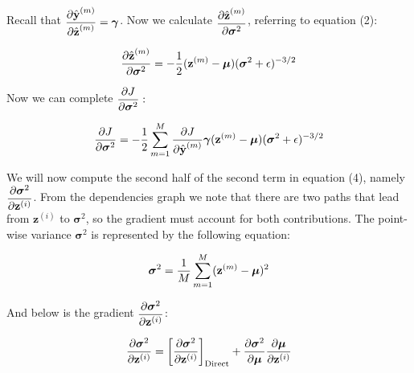 \documentclass{article}
\begin{document}
\begin{multicols}{2}
Recall that $\begin{aligned}
    {\partial \hat{\textbf{y}}^{(m)} \over \partial \hat{\textbf{z}}^{(m)}} = \boldsymbol{\gamma}
\end{aligned}$. Now we calculate $\begin{aligned}
    {\partial \hat{\textbf{z}}^{(m)} \over \partial \boldsymbol{\sigma}^2} 
\end{aligned}$, referring to equation (2):

\begin{equation}
    {\partial \hat{\textbf{z}}^{(m)} \over \partial \boldsymbol{\sigma}^2} =
    -{1\over 2} (\textbf{z}^{(m)} - \boldsymbol{\mu}) (\boldsymbol{\sigma}^2 + \epsilon)^{-3/2} \notag
\end{equation}

Now we can complete $\begin{aligned}
    {\partial J \over \partial \boldsymbol{\sigma}^2}:
\end{aligned}$

\begin{equation}
    {\partial J \over \partial \boldsymbol{\sigma}^2} = -{1\over 2}
    \sum_{m = 1}^M {\partial J \over \partial \hat{\textbf{y}}^{(m)}} 
    \boldsymbol{\gamma}
    (\textbf{z}^{(m)} - \boldsymbol{\mu}) (\boldsymbol{\sigma}^2 + \epsilon)^{-3/2}
\end{equation}

We will now compute the second half of the second term in equation (4), 
namely $\begin{aligned}
    {\partial \boldsymbol{\sigma}^2 \over \partial \textbf{z}^{(i)}}
\end{aligned}$. From the dependencies graph we 
note that there are two paths that lead from $\textbf{z}^{(i)}$ to 
$\boldsymbol{\sigma}^2$, so the gradient must account for both contributions.
The point-wise variance $\boldsymbol{\sigma}^2$ is 
represented by the following equation:

\begin{equation}
    \boldsymbol{\sigma}^2 = {1\over M} 
    \sum_{m = 1}^M (\textbf{z}^{(m)} - \boldsymbol{\mu})^2
\end{equation}

And below is the gradient $\begin{aligned}
    {\partial \boldsymbol{\sigma}^2 \over \partial \textbf{z}^{(i)}}
\end{aligned}$:

\begin{equation}
    {\partial \boldsymbol{\sigma}^2 \over \partial \textbf{z}^{(i)}} = 
    \bigg[{\partial \boldsymbol{\sigma}^2 \over \partial \textbf{z}^{(i)}} \bigg]_{\text{Direct}}
    + {\partial \boldsymbol{\sigma}^2 \over \partial \boldsymbol{\mu}}
    {\partial \boldsymbol{\mu} \over \partial \textbf{z}^{(i)}}
\end{equation}


\end{multicols}
\end{document}
